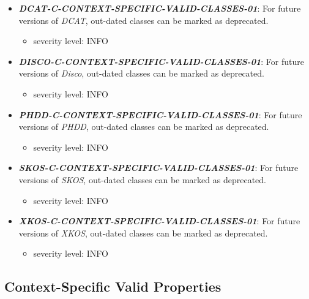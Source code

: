 \documentclass{llncs}
\begin{document}
\begin{itemize}
	\item \textbf{{\em DCAT-C-CONTEXT-SPECIFIC-VALID-CLASSES-01}}: For future versions of \emph{DCAT}, out-dated classes can be marked as deprecated.
	\begin{itemize}
		\item severity level: INFO
	\end{itemize}
\end{itemize}

\begin{itemize}
	\item \textbf{{\em DISCO-C-CONTEXT-SPECIFIC-VALID-CLASSES-01}}: For future versions of \emph{Disco}, out-dated classes can be marked as deprecated.
	\begin{itemize}
		\item severity level: INFO
	\end{itemize}
\end{itemize}

\begin{itemize}
	\item \textbf{{\em PHDD-C-CONTEXT-SPECIFIC-VALID-CLASSES-01}}: For future versions of \emph{PHDD}, out-dated classes can be marked as deprecated.
	\begin{itemize}
		\item severity level: INFO
	\end{itemize}
\end{itemize}

\begin{itemize}
	\item \textbf{{\em SKOS-C-CONTEXT-SPECIFIC-VALID-CLASSES-01}}: For future versions of \emph{SKOS}, out-dated classes can be marked as deprecated.
	\begin{itemize}
		\item severity level: INFO
	\end{itemize}
\end{itemize}

\begin{itemize}
	\item \textbf{{\em XKOS-C-CONTEXT-SPECIFIC-VALID-CLASSES-01}}: For future versions of \emph{XKOS}, out-dated classes can be marked as deprecated.
	\begin{itemize}
		\item severity level: INFO
	\end{itemize}
\end{itemize}

\subsection{Context-Specific Valid Properties}
\end{document}
